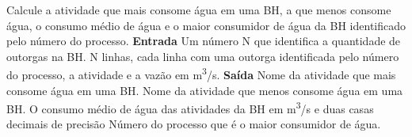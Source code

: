 \documentclass[a4paper, 12pt]{article}
\begin{document}
Calcule a atividade que mais consome água em uma BH, a que menos consome água, o consumo médio de água e o maior consumidor de água da BH identificado pelo número do processo.
\newline \newline
\textbf{{\large Entrada}} \newline
Um número N que identifica a quantidade de outorgas na BH. \newline
N linhas, cada linha com uma outorga identificada pelo número do processo, a atividade e a vazão em m\textsuperscript{3}/s.
\newline \newline
\textbf{{\large Saída}} \newline
Nome da atividade que mais consome água em uma BH. \newline
Nome da atividade que menos consome água em uma BH. \newline
O consumo médio de água das atividades da BH em m\textsuperscript{3}/s e duas casas decimais de precisão
Número do processo que é o maior consumidor de água.
\newline \newline
\newline
\end{document}
